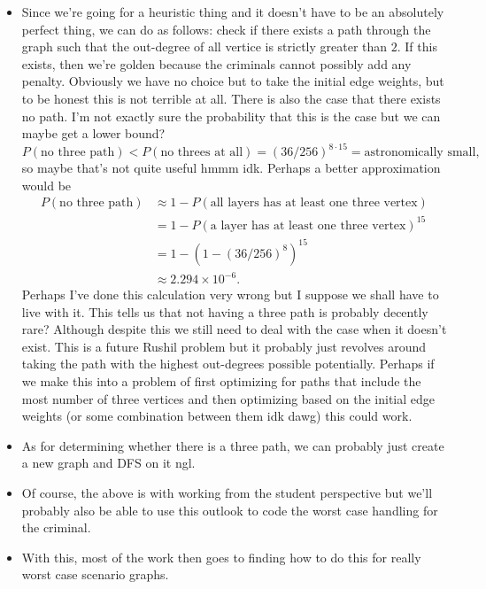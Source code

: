 \documentclass[a4paper, 12pt]{article}
\begin{document}
\begin{itemize}
    \item Since we're going for a heuristic thing and it doesn't have to be an absolutely perfect thing, we can do as follows: check if there exists a path through the graph such that the out-degree of all vertice is strictly greater than \( 2 \). If this exists, then we're golden because the criminals cannot possibly add any penalty. Obviously we have no choice but to take the initial edge weights, but to be honest this is not terrible at all. There is also the case that there exists no path. I'm not exactly sure the probability that this is the case but we can maybe get a lower bound?
        \[
            P(\text{no three path}) < P(\text{no threes at all}) = (36/256)^{8 \cdot 15} = \text{astronomically small}
        ,\]
        so maybe that's not quite useful hmmm idk. Perhaps a better approximation would be
        \begin{align*}
            P(\text{no three path}) &\approx 1 - P(\text{all layers has at least one three vertex}) \\
            &= 1 - P(\text{a layer has at least one three vertex})^{15} \\
            &= 1 - (1 - (36 / 256)^8)^{15} \\
            &\approx 2.294 \times 10^{-6}
        .\end{align*}
        Perhaps I've done this calculation very wrong but I suppose we shall have to live with it. This tells us that not having a three path is probably decently rare? Although despite this we still need to deal with the case when it doesn't exist. This is a future Rushil problem but it probably just revolves around taking the path with the highest out-degrees possible potentially. Perhaps if we make this into a problem of first optimizing for paths that include the most number of three vertices and then optimizing based on the initial edge weights (or some combination between them idk dawg) this could work.

    \item As for determining whether there is a three path, we can probably just create a new graph and DFS on it ngl.
    \item Of course, the above is with working from the student perspective but we'll probably also be able to use this outlook to code the worst case handling for the criminal. 
    \item With this, most of the work then goes to finding how to do this for really worst case scenario graphs.


\end{itemize}
\end{document}
